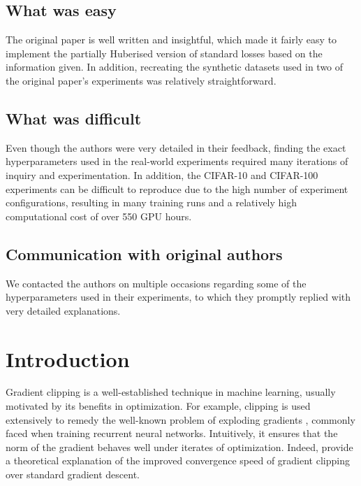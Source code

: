 \subsection*{What was easy}

The original paper is well written and insightful, which made it fairly easy to implement the partially Huberised version of standard losses based on the information given. In addition, recreating the synthetic datasets used in two of the original paper's experiments was relatively straightforward.

\subsection*{What was difficult}

Even though the authors were very detailed in their feedback, finding the exact hyperparameters used in the real-world experiments required many iterations of inquiry and experimentation. In addition, the CIFAR-10 and CIFAR-100 experiments can be difficult to reproduce due to the high number of experiment configurations, resulting in many training runs and a relatively high computational cost of over 550 GPU hours.

\subsection*{Communication with original authors}

We contacted the authors on multiple occasions regarding some of the hyperparameters used in their experiments, to which they promptly replied with very detailed explanations.

\newpage


\section{Introduction}


Gradient clipping is a well-established technique in machine learning, usually motivated by its benefits in optimization. For example, clipping is used extensively to remedy the well-known problem of exploding gradients \parencite{bengio1994learning}, commonly faced when training recurrent neural networks. Intuitively, it ensures that the norm of the gradient behaves well under iterates of optimization. Indeed, \textcite{zhang2019analysis} provide a theoretical explanation of the improved convergence speed of gradient clipping over standard gradient descent.

